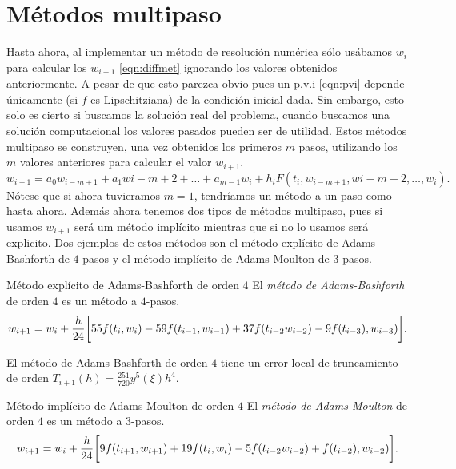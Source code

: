 \section{Métodos multipaso}

Hasta ahora, al implementar un método de resolución numérica sólo usábamos
$w_i$ para calcular los $w_{i+1}$ \eqref{eqn:diffmet}
ignorando los valores obtenidos anteriormente.
A pesar de que esto parezca obvio pues un p.v.i \eqref{eqn:pvi}
depende únicamente (si $f$ es Lipschitziana) de la condición inicial dada.
Sin embargo, esto solo es cierto si buscamos la solución real del problema,
cuando buscamos una solución computacional
los valores pasados pueden ser de utilidad.
Estos métodos multipaso se construyen, una vez obtenidos los primeros $m$ pasos,
utilizando los $m$ valores anteriores para calcular el valor $w_{i+1}$.
\begin{equation*}
    w_{i+1} = a_0w_{i-m+1} + a_1w{i-m+2} + \dots + a_{m-1}w_i
        + h_iF(t_i,w_{i-m+1},w{i-m+2},\dots,w_i).
\end{equation*}
Nótese que si ahora tuvieramos $m = 1$,
tendríamos un método a un paso como hasta ahora.
Además ahora tenemos dos tipos de métodos multipaso, pues si usamos $w_{i+1}$
será um método implícito mientras que si no lo usamos será explicito.
Dos ejemplos de estos métodos son
el método explícito de Adams-Bashforth de $4$ pasos
y el método implícito de Adams-Moulton de $3$ pasos.

\begin{method}{Método explícito de Adams-Bashforth de orden $4$}
    El \emph{método de Adams-Bashforth} de orden $4$
    es un método a $4$-pasos.
    \begin{equation}\label{eqn:AB4steps}
        w_{i+1} = w_i + \frac{h}{24}\qty\bigg[
            55f(t_i,w_i) - 59f(t_{i-1},w_{i-1})
            + 37f(t_{i-2}w_{i-2}) - 9f(t_{i-3}),w_{i-3})
        ].
    \end{equation}
\end{method}

\begin{proposition}
    El método de Adams-Bashforth de orden $4$
    tiene un error local de truncamiento
    de orden $T_{i+1}(h) = \frac{251}{720}y^5(\xi)h^4$.
\end{proposition}

\begin{method}{Método implícito de Adams-Moulton de orden $4$}
    El \emph{método de Adams-Moulton} de orden $4$
    es un método a $3$-pasos.
    \begin{equation}\label{eqn:AM3steps}
        w_{i+1} = w_i + \frac{h}{24}\qty\bigg[
            9f(t_{i+1},w_{i+1}) + 19f(t_i,w_i)
            - 5f(t_{i-2}w_{i-2}) + f(t_{i-2}),w_{i-2})
        ].
    \end{equation}
\end{method}

